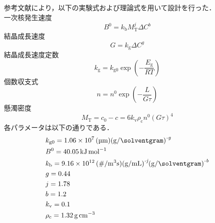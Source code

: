 \documentclass[a4j]{jsreport}
\begin{document}
参考文献\cite{晶析}により，以下の実験式および理論式を用いて設計を行った．\\
一次核発生速度
\begin{equation}
    B^0 = k_\mathrm{b} M_\mathrm{T}^j \varDelta C^b
\end{equation}
結晶成長速度
\begin{equation}
    G = k_\mathrm{g} \varDelta C^g
\end{equation}
結晶成長速度定数
\begin{equation}
    k_\mathrm{g} = k_\mathrm{g0} \exp \left( -\frac{E_\mathrm{g}}{RT} \right)
\end{equation}
個数収支式
\begin{equation}
    n=n^0 \exp \left( -\frac{L}{G\tau} \right)
\end{equation}
懸濁密度
\begin{equation}
    M_\mathrm{T} = c_0-c = 6k_\mathrm{v} \rho_\mathrm{c} n^0 (G\tau)^4
\end{equation}
各パラメータは以下の通りである．
\begin{align*}
    &k_\mathrm{g0} = 1.06\times10^7 \, \si{(\micro \meter)(\gram / \solventgram)^{\textit{-g}}} \\
    &B^{\mathrm{0}} = 40.05 \, \si{\kilo \joule \per \mole} \\
    &k_\mathrm{b} = 9.16 \times 10^{12} \, \si{(\# / \cubic \meter \second) (\gram / \milli \liter)^{\textit{-j}} (\gram / \solventgram)^{\textit{-b}}} \\
    &g = 0.44 \\
    &j = 1.78 \\
    &b = 1.2 \\
    &k_\mathrm{v} = 0.1 \\
    &\rho_\mathrm{c} = 1.32 \, \si{\gram \per \centi \metre \cubed}
\end{align*}
\end{document}
